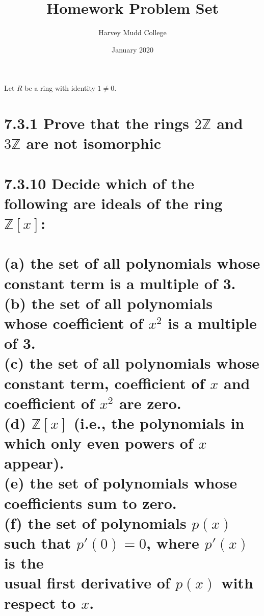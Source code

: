 \documentclass{article}
\title{\textbf{Homework Problem Set \mypound 1}}
\author{Harvey Mudd College}
\date{January 2020}
\begin{document}
\maketitle

\large{} Let $R$ be a ring with identity $1\neq0.$

\section*{\hspace{-0.6cm}7.3.1\Large{} \normalfont Prove that the rings $2\mathbb{Z}$ and $3\mathbb{Z}$ are not isomorphic}

\newpage

\section*{\hspace{-1.55cm}7.3.10\Large{} \normalfont Decide which of the following are ideals of the ring $\mathbb{Z}[x]$:
\\
\\\large \hspace*{-1cm} (a) the set of all polynomials whose constant term is a multiple of 3.
\\
         \hspace*{-1cm} (b) the set of all polynomials whose coefficient of $x^2$ is a multiple of  3.
\\
         \hspace*{-1cm} (c) the set of all polynomials whose constant term, coefficient of $x$ and \hspace*{-0.16cm}coefficient of $x^2$ are zero.
\\
         \hspace*{-1cm} (d) $\mathbb{Z}[x]$ (i.e., the polynomials in which only even powers of $x$ appear).
\\      
         \hspace*{-1cm} (e) the set of polynomials whose coefficients sum to zero.
\\       
         \hspace*{-1cm} (f) the set of polynomials $p(x)$ such that $p'(0)=0$, where $p'(x)$ is the \\ 
         \hspace*{-0.4cm} usual first derivative of $p(x)$ with respect to $x$.}
         
\newpage
\end{document}

